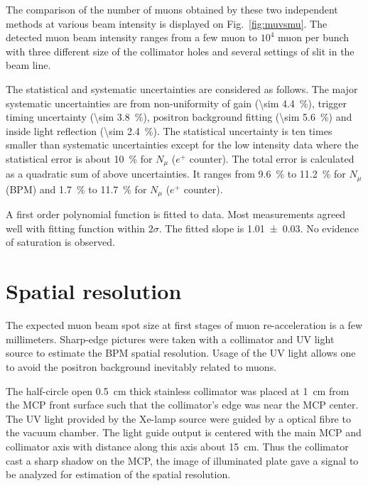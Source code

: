 \documentclass[preprint,3p,twocolumn]{elsarticle}
\begin{document}
The comparison of the number of muons obtained by these two independent methods at various beam intensity is displayed on Fig.~\ref{fig:muvsmu}. The detected muon beam intensity ranges from a few muon to $10^{4}$ muon per bunch with three different size of the collimator holes and several settings of slit in the beam line.

The statistical and systematic uncertainties are considered as follows. The major systematic uncertainties are from non-uniformity of gain (\SI{\sim 4.4}{\percent}), trigger timing uncertainty (\SI{\sim 3.8}{\percent}),
positron background fitting (\SI{\sim 5.6}{\percent}) and inside light reflection (\SI{\sim 2.4}{\percent}).
The statistical uncertainty is ten times smaller than systematic uncertainties except for the low intensity data where the statistical error is about \SI{10}{\percent} for $N_\mu$ ($e^+$ counter).
The total error is calculated as a quadratic sum of above uncertainties. It ranges from \SI{9.6}{\percent} to \SI{11.2}{\percent} for $N_\mu$ (BPM) and \SI{1.7}{\percent} to \SI{11.7}{\percent} for $N_\mu$ ($e^+$ counter).

A first order polynomial function is fitted to data.
Most measurements agreed well with fitting function within $2\sigma$.  
The fitted slope is \num{1.01 \pm 0.03}. No evidence of saturation is observed. 

\section{Spatial resolution}
 
The expected muon beam spot size at first stages of muon re-acceleration is a few millimeters.
Sharp-edge pictures were taken with a collimator and UV light source to estimate the BPM spatial resolution.
Usage of the UV light allows one to avoid the positron background inevitably related to muons.

The half-circle open \SI{.5}{\cm} thick stainless collimator was placed at \SI{1}{\cm} from the MCP front surface
such that the collimator's edge was near the MCP center.
The UV light provided by the Xe-lamp source were guided by a optical fibre to the vacuum chamber.
The light guide output is centered with the main MCP and collimator axis
with distance along this axis about \SI{15}{\cm}.
Thus the collimator cast a sharp shadow on the MCP,
the image of illuminated plate gave a signal to be analyzed for estimation of the spatial resolution.
\end{document}
